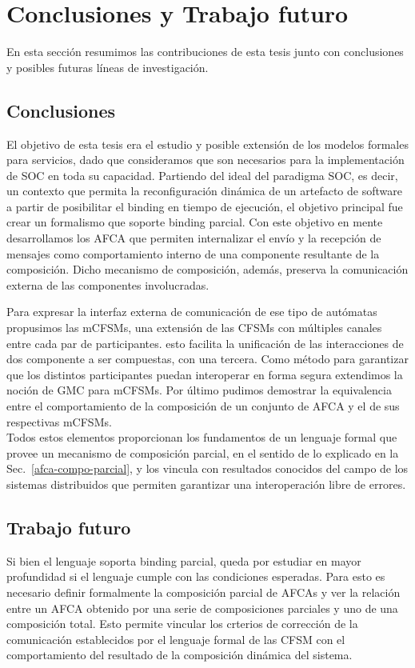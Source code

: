 \newpage
\chapter{Conclusiones y Trabajo futuro} 
\label{conclusiones}

En esta sección resumimos las contribuciones de esta tesis junto con conclusiones y posibles futuras líneas de investigación.


\section{Conclusiones} 

El objetivo de esta tesis era el estudio y posible extensión de los modelos formales para servicios, dado que consideramos que son necesarios para la implementación de SOC en toda su capacidad. Partiendo del ideal del paradigma SOC, es decir, un contexto que permita la reconfiguración dinámica de un artefacto de software a partir de posibilitar el binding en tiempo de ejecución, el objetivo principal fue crear un formalismo que soporte binding parcial. Con este objetivo en mente desarrollamos los AFCA que permiten internalizar el envío y la recepción de mensajes como comportamiento interno de una componente resultante de la composición. Dicho mecanismo de composición, además, preserva la comunicación externa de las componentes involucradas.

Para expresar la interfaz externa de comunicación de ese tipo de autómatas propusimos las mCFSMs, una extensión de las CFSMs con múltiples canales entre cada par de participantes. esto facilita la unificación de las interacciones de dos componente a ser compuestas, con una tercera. Como método para garantizar que los distintos participantes puedan interoperar en forma segura extendimos la noción de GMC para mCFSMs. Por último pudimos demostrar la equivalencia entre el comportamiento de la composición de un conjunto de AFCA y el de sus respectivas mCFSMs.\\

Todos estos elementos proporcionan los fundamentos de un lenguaje formal que provee un mecanismo de composición parcial, en el sentido de lo explicado en la Sec.~\ref{afca-compo-parcial}, y los vincula con resultados conocidos del campo de los sistemas distribuidos que permiten garantizar una interoperación libre de errores.


\section{Trabajo futuro}
Si bien el lenguaje soporta binding parcial, queda por estudiar en mayor profundidad si el lenguaje cumple con las condiciones esperadas. Para esto es necesario definir formalmente la composición parcial de AFCAs y ver la relación entre un AFCA obtenido por una serie de composiciones parciales y uno de una composición total. Esto permite vincular los crterios de corrección de la comunicación establecidos por el lenguaje formal de las CFSM con el comportamiento del resultado de la composición dinámica del sistema.

